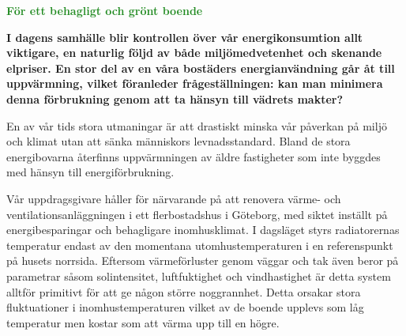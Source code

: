 \documentclass[11pt,a4paper]{article}
\begin{document}
\pagestyle{fancy}
\rhead{\sc\footnotesize \today}
\mbox{}
\vspace{4mm}

\begin{center}
\textcolor{ForestGreen}{\textbf{\Huge För ett behagligt och grönt boende}}
\end{center}

\mbox{}
\vspace{4mm}

\setlength{\columnsep}{5mm}
\begin{multicols}{2}
\addtolength{\parskip}{1mm}
\linespread{1.1}
\normalsize

\begin{comment}
Vårt kandidatarbete, ''Stabilisera temperaturen i en fastighet med avseende på väderförändringar'', genomförs vid institutionen för Teknisk Fysik. Arbetsgruppen består av Mats Lindström, Dan Ståby, Ylva Dahl och Erik Ahlqvist och i vår mening passar projektet utmärkt under kategorin ''Green Initiative \& Sustainable Development''.
\end{comment}

\textbf{I dagens samhälle blir kontrollen över vår energikonsumtion allt viktigare, en naturlig följd av både miljömedvetenhet och skenande elpriser. En stor del av en  våra bostäders energianvändning går åt till uppvärmning, vilket föranleder frågeställningen: kan man minimera denna förbrukning genom att ta hänsyn till vädrets makter?}

En av vår tids stora utmaningar är att drastiskt minska vår påverkan på miljö och klimat utan att sänka människors levnadsstandard. Bland de stora energibovarna återfinns uppvärmningen av äldre fastigheter som inte byggdes med hänsyn till energiförbrukning.

Vår uppdragsgivare håller för närvarande på att renovera värme- och ventilationsanläggningen i ett flerbostadshus i Göteborg, med siktet inställt på energibesparingar och behagligare inomhusklimat. I dagsläget styrs radiatorernas  temperatur endast av den momentana utomhustemperaturen i en referenspunkt på husets norrsida. Eftersom värmeförluster genom väggar och tak även beror på parametrar såsom solintensitet, luftfuktighet och vindhastighet är detta system alltför primitivt för att ge någon större noggrannhet. Detta orsakar stora fluktuationer i inomhustemperaturen vilket av de boende upplevs som låg temperatur men kostar som att värma upp till en högre.


\end{multicols}
\end{document}
